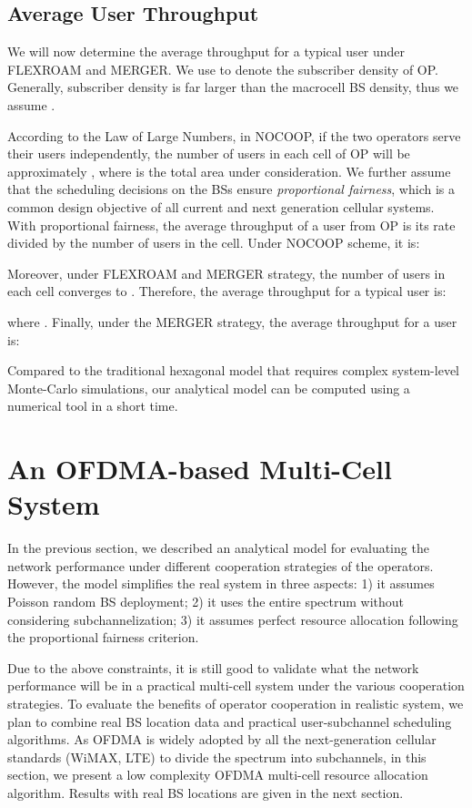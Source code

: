 \documentclass[conference]{IEEEtran}
\begin{document}
\subsection{Average User Throughput}

We will now determine the average throughput for a typical user under FLEXROAM and MERGER. We use  to denote the subscriber density of OP. Generally, subscriber density is far larger than the macrocell BS density, thus we assume .

According to the Law of Large Numbers, in NOCOOP, if the two operators serve their users independently, the number of users in each cell of OP will be approximately , where  is the total area under consideration. We further assume that the scheduling decisions on the BSs ensure \textit{proportional fairness}, which is a common design objective of all current and next generation cellular systems. With proportional fairness, the average throughput of a user from OP is its rate divided by the number of users in the cell. Under NOCOOP scheme, it is:



Moreover, under FLEXROAM and MERGER strategy, the number of users in each cell converges to . Therefore, the average throughput for a typical user is:

where . Finally, under the MERGER strategy, the average throughput for a user is:


Compared to the traditional hexagonal model that requires complex system-level Monte-Carlo simulations, our analytical model can be computed using a numerical tool in a short time.

\section{An OFDMA-based Multi-Cell System}

In the previous section, we described an analytical model for evaluating the network performance under different cooperation strategies of the operators. However, the model simplifies the real system in three aspects: 1) it assumes Poisson random BS deployment; 2) it uses the entire spectrum without considering subchannelization; 3) it assumes perfect resource allocation following the proportional fairness criterion.

Due to the above constraints, it is still good to validate what the network performance will be in a practical multi-cell system under the various cooperation strategies. To evaluate the benefits of operator cooperation in realistic system, we plan to combine real BS location data and practical user-subchannel scheduling algorithms. As OFDMA is widely adopted by all the next-generation cellular standards (WiMAX, LTE) to divide the spectrum into subchannels, in this section, we present a low complexity OFDMA multi-cell resource allocation algorithm. Results with real BS locations are given in the next section.
\end{document}
